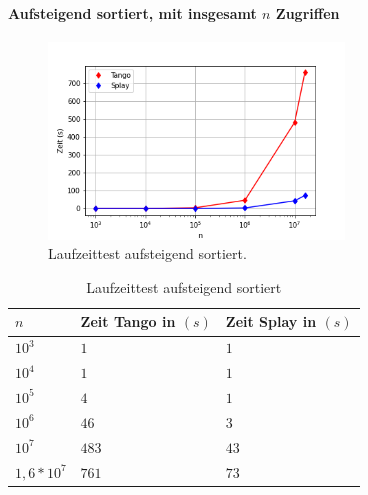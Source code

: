 \documentclass[a4paper,12pt]{article}
\begin{document}
\paragraph{Aufsteigend sortiert, mit insgesamt $n$ Zugriffen}
\begin{figure}[H]
	\centering
	\includegraphics[width=0.7\textwidth]{"Medien/laufzeittest/diagramm/sorted1"}
	\caption{Laufzeittest aufsteigend sortiert.}
\end{figure}
\begin{table}[H]
	\begin{center}
		\begin{tabular}[c]{|l|l|l|}
			\hline
			$n$ & Zeit Tango in $\left(s\right)$ &Zeit Splay in $\left(s\right)$ \\
			\hline
			$10^3$ & $1$ &$1$ \\
			\hline
			$10^4$  & $1$ &$1$  \\
			\hline
			$10^5$  & $4$ &$1$  \\
			\hline
			$10^6$  & $46$ &$3$  \\
			\hline
			$10^7$  & $483$ &$43$  \\
			\hline
			$1,6 *10^7$  & $761$ &$73$  \\
			\hline
		\end{tabular}
		\caption{Laufzeittest aufsteigend sortiert} 
	\end{center}
\end{table}
\end{document}
